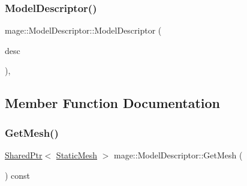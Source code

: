 \hypertarget{classmage_1_1_model_descriptor_a0b9c94c989ef70b6149a571106a1a73c}{}\label{classmage_1_1_model_descriptor_a0b9c94c989ef70b6149a571106a1a73c} 
\subsubsection{\texorpdfstring{Model\+Descriptor()}{ModelDescriptor()}\hspace{0.1cm}{\footnotesize\ttfamily [3/3]}}
{\footnotesize\ttfamily mage\+::\+Model\+Descriptor\+::\+Model\+Descriptor (\begin{DoxyParamCaption}\item[{\hyperlink{classmage_1_1_model_descriptor}{Model\+Descriptor} \&\&}]{desc }\end{DoxyParamCaption})\hspace{0.3cm}{\ttfamily [private]}, {\ttfamily [delete]}}



\subsection{Member Function Documentation}
\hypertarget{classmage_1_1_model_descriptor_a0781eed81d27ed936503056bbd46ab58}{}\label{classmage_1_1_model_descriptor_a0781eed81d27ed936503056bbd46ab58} 
\subsubsection{\texorpdfstring{Get\+Mesh()}{GetMesh()}}
{\footnotesize\ttfamily \hyperlink{namespacemage_a1e01ae66713838a7a67d30e44c67703e}{Shared\+Ptr}$<$ \hyperlink{classmage_1_1_static_mesh}{Static\+Mesh} $>$ mage\+::\+Model\+Descriptor\+::\+Get\+Mesh (\begin{DoxyParamCaption}{ }\end{DoxyParamCaption}) const}

\hypertarget{classmage_1_1_model_descriptor_a64a2ca531c03cd8d79eda3a728e6efa1}{}\label{classmage_1_1_model_descriptor_a64a2ca531c03cd8d79eda3a728e6efa1} 
